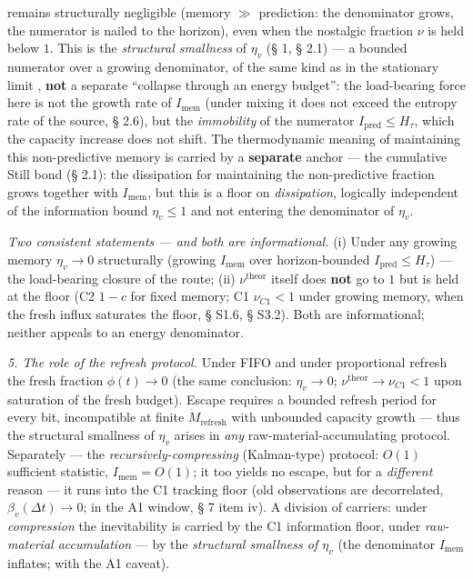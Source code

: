 \documentclass[12pt]{iopart}
\begin{document}
remains structurally negligible (memory \(\gg\) prediction: the denominator grows, the numerator is nailed to the horizon), even when the nostalgic fraction \(\nu\) is held below \(1\). This is the \emph{structural smallness} of \(\eta_v\) (§ 1, § 2.1) --- a bounded numerator over a growing denominator, of the same kind as in the stationary limit \cite{Andriishin2026b}, \textbf{not} a separate ``collapse through an energy budget'': the load-bearing force here is not the growth rate of \(I_{\text{mem}}\) (under mixing it does not exceed the entropy rate of the source, § 2.6), but the \emph{immobility} of the numerator \(I_{\text{pred}} \le H_\tau\), which the capacity increase does not shift. The thermodynamic meaning of maintaining this non-predictive memory is carried by a \textbf{separate} anchor --- the cumulative Still bond (§ 2.1): the dissipation for maintaining the non-predictive fraction grows together with \(I_{\text{mem}}\), but this is a floor on \emph{dissipation}, logically independent of the information bound \(\eta_v \le 1\) and not entering the denominator of \(\eta_v\).



\emph{Two consistent statements --- and both are informational.} (i) Under any growing memory \(\eta_v \to 0\) structurally (growing \(I_{\text{mem}}\) over horizon-bounded \(I_{\text{pred}} \le H_\tau\)) --- the load-bearing closure of the route; (ii) \(\nu^{\text{theor}}\) itself does \textbf{not} go to \(1\) but is held at the floor (C2 \(1-c\) for fixed memory; C1 \(\nu_{C1} < 1\) under growing memory, when the fresh influx saturates the floor, § S1.6, § S3.2). Both are informational; neither appeals to an energy denominator.



\emph{5. The role of the refresh protocol.} Under FIFO and under proportional refresh the fresh fraction \(\phi(t) \to 0\) (the same conclusion: \(\eta_v \to 0\); \(\nu^{\text{theor}} \to \nu_{C1} < 1\) upon saturation of the fresh budget). Escape requires a bounded refresh period for every bit, incompatible at finite \(\dot M_{\text{refresh}}\) with unbounded capacity growth --- thus the structural smallness of \(\eta_v\) arises in \emph{any} raw-material-accumulating protocol. Separately --- the \emph{recursively-compressing} (Kalman-type) protocol: \(O(1)\) sufficient statistic, \(I_{\text{mem}} = O(1)\); it too yields no escape, but for a \emph{different} reason --- it runs into the C1 tracking floor (old observations are decorrelated, \(\beta_v(\Delta t)\to0\); in the A1 window, § 7 item iv). A division of carriers: under \emph{compression} the inevitability is carried by the C1 information floor, under \emph{raw-material accumulation} --- by the \emph{structural smallness of \(\eta_v\)} (the denominator \(I_{\text{mem}}\) inflates; with the A1 caveat).
\end{document}
